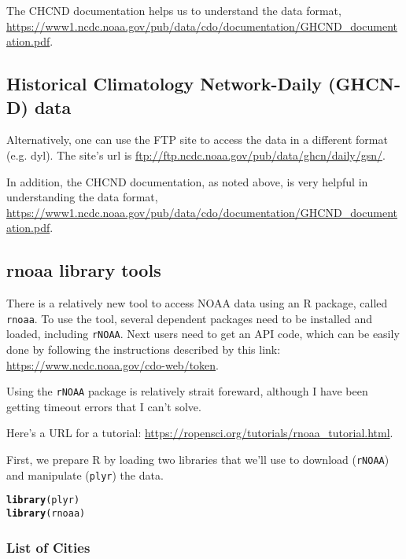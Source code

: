 \documentclass{article}\usepackage[]{graphicx}\usepackage[]{color}
\makeatletter
\newcommand{\hlstd}[1]{\textcolor[rgb]{0.345,0.345,0.345}{#1}}%
\newcommand{\hlkwd}[1]{\textcolor[rgb]{0.737,0.353,0.396}{\textbf{#1}}}%
\newenvironment{kframe}{%
 \def\at@end@of@kframe{}%
 \ifinner\ifhmode%
  \def\at@end@of@kframe{\end{minipage}}%
  \begin{minipage}{\columnwidth}%
 \fi\fi%
 \def\FrameCommand##1{\hskip\@totalleftmargin \hskip-\fboxsep
 \colorbox{shadecolor}{##1}\hskip-\fboxsep
     \hskip-\linewidth \hskip-\@totalleftmargin \hskip\columnwidth}%
 \MakeFramed {\advance\hsize-\width
   \@totalleftmargin\z@ \linewidth\hsize
   \@setminipage}}%
 {\par\unskip\endMakeFramed%
 \at@end@of@kframe}
\newenvironment{knitrout}{}{} %
\makeatother
\begin{document}
The CHCND documentation helps us to understand the data format, \url{https://www1.ncdc.noaa.gov/pub/data/cdo/documentation/GHCND_documentation.pdf}.

\subsection{Historical Climatology Network-Daily (GHCN‐D) data}

Alternatively, one can use the FTP site to access the data in a different format (e.g. dyl). The site's url is \url{ftp://ftp.ncdc.noaa.gov/pub/data/ghcn/daily/gsn/}. 

In addition, the CHCND documentation, as noted above, is very helpful in understanding the data format, \url{https://www1.ncdc.noaa.gov/pub/data/cdo/documentation/GHCND_documentation.pdf}.

\subsection{rnoaa library tools}

There is a relatively new tool to access NOAA data using an R package, called \texttt{rnoaa}. To use the tool, several dependent packages need to be installed and loaded, including \texttt{rNOAA}. Next users need to get an API code, which can be easily done by following the instructions described by this link: \url{https://www.ncdc.noaa.gov/cdo-web/token}.

Using the \texttt{rNOAA} package is relatively strait foreward, although I have been getting timeout errors that I can't solve. 

Here's a URL for a tutorial: \url{https://ropensci.org/tutorials/rnoaa_tutorial.html}.

First, we prepare R by loading two libraries that we'll use to download (\texttt{rNOAA}) and manipulate (\texttt{plyr}) the data.
\begin{knitrout}
\color{fgcolor}\begin{kframe}
\begin{alltt}
\hlkwd{library}\hlstd{(plyr)}
\hlkwd{library}\hlstd{(rnoaa)}
\end{alltt}
\end{kframe}
\end{knitrout}



\subsubsection{List of Cities}
\end{document}
